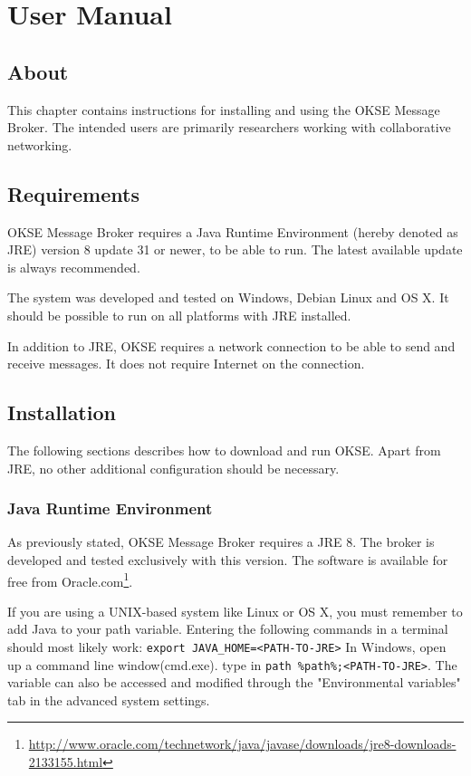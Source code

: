 \chapter{User Manual}

\section{About}

This chapter contains instructions for installing and using the OKSE Message Broker. The intended users are primarily researchers working with collaborative networking.

\section{Requirements}

OKSE Message Broker requires a Java Runtime Environment (hereby denoted as JRE) version 8 update 31 or newer, to be able to run. The latest available update is always recommended. 

The system was developed and tested on Windows, Debian Linux and OS X. It should be possible to run on all platforms with JRE installed. 

In addition to JRE, OKSE requires a network connection to be able to send and receive messages. It does not require Internet on the connection. 

\section{Installation}

The following sections describes how to download and run OKSE. Apart from JRE, no other additional configuration should be necessary.

\subsection{Java Runtime Environment}

As previously stated, OKSE Message Broker requires a JRE 8. The broker is developed and tested exclusively with this version. The software is available for free from Oracle.com\footnote{\url{http://www.oracle.com/technetwork/java/javase/downloads/jre8-downloads-2133155.html}}.

If you are using a UNIX-based system like Linux or OS X, you must remember to add Java to your path variable. Entering the following commands in a terminal should most likely work: \verb!export JAVA_HOME=<PATH-TO-JRE>! In Windows, open up a command line window(cmd.exe). type in  \verb!path %path%;<PATH-TO-JRE>!.
The variable can also be accessed and modified through the "Environmental variables" tab in the advanced system settings.

